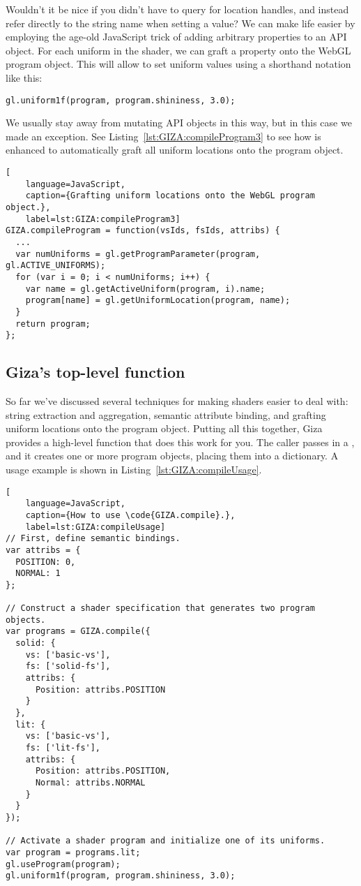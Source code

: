 Wouldn't it be nice if you didn't have to query for location handles, and instead refer directly to the string name when setting a value?  We can make life easier by employing the age-old JavaScript trick of adding arbitrary properties to an API object.  For each uniform in the shader, we can graft a property onto the WebGL program object.  This will allow to set uniform values using a shorthand notation like this:

\begin{lstlisting}
gl.uniform1f(program, program.shininess, 3.0);
\end{lstlisting}

We usually stay away from mutating API objects in this way, but in this case we made an exception.  See Listing~\ref{lst:GIZA:compileProgram3} to see how  is enhanced to automatically graft all uniform locations onto the program object.

\begin{lstlisting}[
    language=JavaScript,
    caption={Grafting uniform locations onto the WebGL program object.},
    label=lst:GIZA:compileProgram3]
GIZA.compileProgram = function(vsIds, fsIds, attribs) {
  ...
  var numUniforms = gl.getProgramParameter(program, gl.ACTIVE_UNIFORMS);
  for (var i = 0; i < numUniforms; i++) {
    var name = gl.getActiveUniform(program, i).name;
    program[name] = gl.getUniformLocation(program, name);
  }
  return program;
};
\end{lstlisting}

\subsection{Giza's top-level  function}

So far we've discussed several techniques for making shaders easier to deal with: string extraction and aggregation, semantic attribute binding, and grafting uniform locations onto the program object.  Putting all this together, Giza provides a high-level  function that does this work for you.  The caller passes in a , and it creates one or more program objects, placing them into a dictionary.  A usage example is shown in Listing~\ref{lst:GIZA:compileUsage}.

\begin{lstlisting}[
    language=JavaScript,
    caption={How to use \code{GIZA.compile}.},
    label=lst:GIZA:compileUsage]
// First, define semantic bindings.
var attribs = {
  POSITION: 0,
  NORMAL: 1
};

// Construct a shader specification that generates two program objects.
var programs = GIZA.compile({
  solid: {
    vs: ['basic-vs'],
    fs: ['solid-fs'],
    attribs: {
      Position: attribs.POSITION
    }
  },
  lit: {
    vs: ['basic-vs'],
    fs: ['lit-fs'],
    attribs: {
      Position: attribs.POSITION,
      Normal: attribs.NORMAL
    }
  }
});

// Activate a shader program and initialize one of its uniforms.
var program = programs.lit;
gl.useProgram(program);
gl.uniform1f(program, program.shininess, 3.0);
\end{lstlisting}

